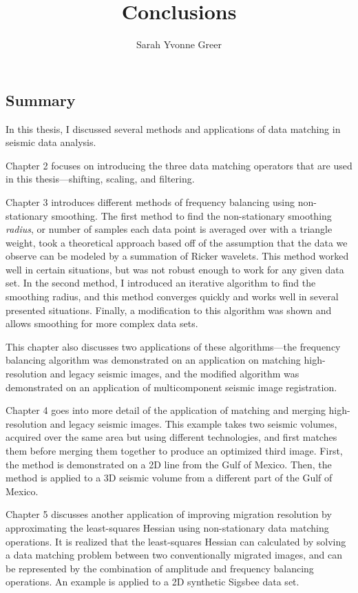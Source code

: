 \title{Conclusions}
\author{Sarah Yvonne Greer}
\maketitle

\subsection{Summary}

In this thesis, I discussed several methods and applications of data matching in seismic data analysis.

Chapter 2 focuses on introducing the three data matching operators that are used in this thesis---shifting, scaling, and filtering.

Chapter 3 introduces different methods of frequency balancing using non-stationary smoothing. 
The first method to find the non-stationary smoothing {\em radius}, or number of samples each data point is averaged over with a triangle weight, took a theoretical approach based off of the assumption that the data we observe can be modeled by a summation of Ricker wavelets.
This method worked well in certain situations, but was not robust enough to work for any given data set.
In the second method, I introduced an iterative algorithm to find the smoothing radius, and this method converges quickly and works well in several presented situations. 
Finally, a modification to this algorithm was shown and allows smoothing for more complex data sets.

This chapter also discusses two applications of these algorithms---the frequency balancing algorithm was demonstrated on an application on matching high-resolution and legacy seismic images, and the modified algorithm was demonstrated on an application of multicomponent seismic image registration.

Chapter 4 goes into more detail of the application of matching and merging high-resolution and legacy seismic images.
This example takes two seismic volumes, acquired over the same area but using different technologies, and first matches them before merging them together to produce an optimized third image.
First, the method is demonstrated on a 2D line from the Gulf of Mexico.
Then, the method is applied to a 3D seismic volume from a different part of the Gulf of Mexico.

Chapter 5 discusses another application of improving migration resolution by approximating the least-squares Hessian using non-stationary data matching operations.
It is realized that the least-squares Hessian can calculated by solving a data matching problem between two conventionally migrated images, and can be represented by the combination of amplitude and frequency balancing operations.
An example is applied to a 2D synthetic Sigsbee data set.

